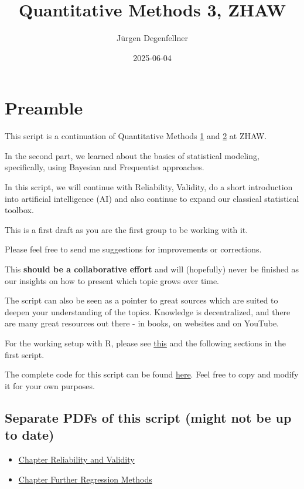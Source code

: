 \documentclass[
]{book}
\title{Quantitative Methods 3, ZHAW}
\author{Jürgen Degenfellner}
\date{2025-06-04}
\begin{document}
\maketitle

{
\setcounter{tocdepth}{1}
\tableofcontents
}
\chapter{Preamble}\label{intro0}

This script is a continuation of Quantitative Methods
\href{https://jdegenfellner.github.io/Script_QM1_ZHAW/}{1} and
\href{https://jdegenfellner.github.io/Script_QM2_ZHAW/}{2} at ZHAW.

In the second part, we learned about the basics of statistical modeling,
specifically, using Bayesian and Frequentist approaches.

In this script, we will continue with Reliability, Validity, do a short introduction
into artificial intelligence (AI) and also continue to expand our classical
statistical toolbox.

This is a first draft as you are the first group to be working with it.

Please feel free to send me suggestions for improvements or corrections.

This \textbf{should be a collaborative effort} and will (hopefully)
never be finished as our insights on how to present which topic grows over time.

The script can also be seen as a pointer to great sources which are
suited to deepen your understanding of the topics. Knowledge is decentralized,
and there are many great resources out there - in books, on websites and on YouTube.

For the working setup with R, please
see \href{https://jdegenfellner.github.io/Script_QM1_ZHAW/index.html\#section}{this}
and the following sections in the first script.

The complete code for this script can be found
\href{https://github.com/jdegenfellner/Script_QM3_ZHAW}{here}.
Feel free to copy and modify it for your own purposes.

\section{Separate PDFs of this script (might not be up to date)}\label{separate-pdfs-of-this-script-might-not-be-up-to-date}

\begin{itemize}
\item
  \href{https://github.com/jdegenfellner/Script_QM3_ZHAW/blob/main/01-Reliability_Validity.pdf}{Chapter Reliability and Validity}
\item
  \href{https://github.com/jdegenfellner/Script_QM3_ZHAW/blob/main/02-Further_Regression_Methods.pdf}{Chapter Further Regression Methods}
\end{itemize}
\end{document}
